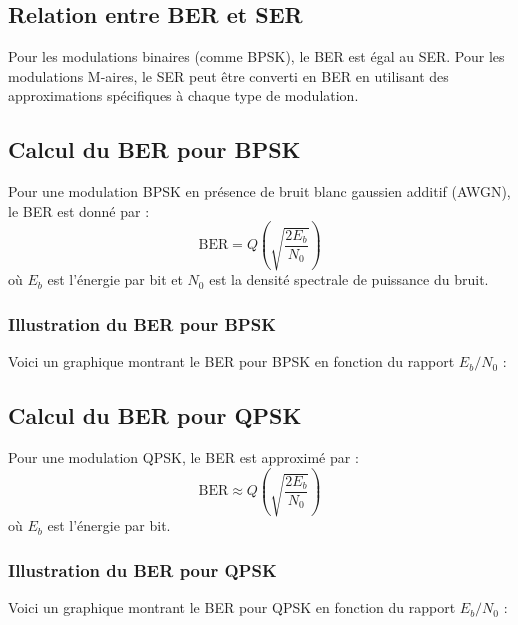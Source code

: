 \documentclass[10pt,a4paper]{article}
\begin{document}
\subsection*{Relation entre BER et SER}
Pour les modulations binaires (comme BPSK), le BER est égal au SER. Pour les modulations M-aires, le SER peut être converti en BER en utilisant des approximations spécifiques à chaque type de modulation.

\subsection*{Calcul du BER pour BPSK}
Pour une modulation BPSK en présence de bruit blanc gaussien additif (AWGN), le BER est donné par :
\[ \text{BER} = Q\left(\sqrt{\frac{2E_b}{N_0}}\right) \]
où \( E_b \) est l'énergie par bit et \( N_0 \) est la densité spectrale de puissance du bruit.

\subsubsection*{Illustration du BER pour BPSK}
Voici un graphique montrant le BER pour BPSK en fonction du rapport \( E_b/N_0 \) :


\subsection*{Calcul du BER pour QPSK}
Pour une modulation QPSK, le BER est approximé par :
\[ \text{BER} \approx Q\left(\sqrt{\frac{2E_b}{N_0}}\right) \]
où \( E_b \) est l'énergie par bit.

\subsubsection*{Illustration du BER pour QPSK}
Voici un graphique montrant le BER pour QPSK en fonction du rapport \( E_b/N_0 \) :
\end{document}
